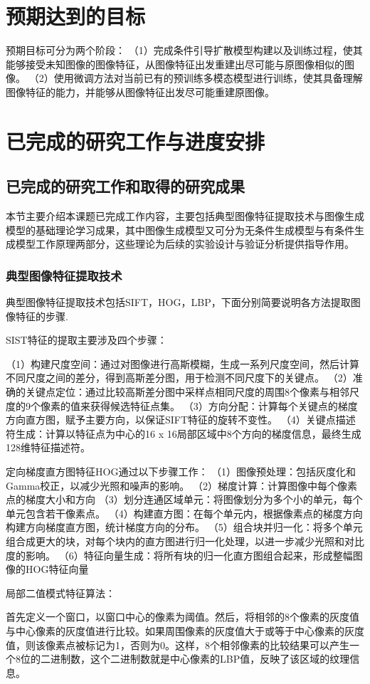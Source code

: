 \section{预期达到的目标}
预期目标可分为两个阶段：
（1）完成条件引导扩散模型构建以及训练过程，使其能够接受未知图像的图像特征，从图像特征出发重建出尽可能与原图像相似的图像。
（2）使用微调方法对当前已有的预训练多模态模型进行训练，使其具备理解图像特征的能力，并能够从图像特征出发尽可能重建原图像。
\section{已完成的研究工作与进度安排}
\subsection{已完成的研究工作和取得的研究成果}\label{sec:finishwork}
本节主要介绍本课题已完成工作内容，主要包括典型图像特征提取技术与图像生成模型的基础理论学习成果，其中图像生成模型又可分为无条件生成模型与有条件生成模型工作原理两部分，这些理论为后续的实验设计与验证分析提供指导作用。
\subsubsection{典型图像特征提取技术}
典型图像特征提取技术包括SIFT，HOG，LBP，下面分别简要说明各方法提取图像特征的步骤.
\par
SIST特征的提取主要涉及四个步骤：
\par
（1）构建尺度空间：通过对图像进行高斯模糊，生成一系列尺度空间，然后计算不同尺度之间的差分，得到高斯差分图，用于检测不同尺度下的关键点。
（2）准确的关键点定位：通过比较高斯差分图中采样点相同尺度的周围8个像素与相邻尺度的9个像素的值来获得候选特征点集。
（3）方向分配：‌计算每个关键点的梯度方向直方图，赋予主要方向，以保证SIFT特征的旋转不变性。
（4）关键点描述符生成：计算以特征点为中心的16 x 16局部区域中8个方向的梯度信息，最终生成128维特征描述符。
\par
定向梯度直方图特征HOG通过以下步骤工作：‌
（1）图像预处理：包括灰度化和Gamma校正，以减少光照和噪声的影响。
（2）‌梯度计算：‌计算图像中每个像素点的梯度大小和方向
（3）划分连通区域单元：‌将图像划分为多个小的单元，每个单元包含若干像素点。
（4）构建直方图：‌在每个单元内，根据像素点的梯度方向构建方向梯度直方图，统计梯度方向的分布。
（5）组合块并归一化：将多个单元组合成更大的块，对每个块内的直方图进行归一化处理，以进一步减少光照和对比度的影响。
（6）特征向量生成：将所有块的归一化直方图组合起来，形成整幅图像的HOG特征向量
\par
局部二值模式特征算法：
\par
首先定义一个窗口‌，以窗口中心的像素为阈值。然后，将相邻的8个像素的灰度值与中心像素的灰度值进行比较。如果周围像素的灰度值大于或等于中心像素的灰度值，则该像素点被标记为1，否则为0。这样，8个相邻像素的比较结果可以产生一个8位的二进制数，这个二进制数就是中心像素的LBP值，反映了该区域的纹理信息。
